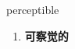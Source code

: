 
\begin{frame}
{\huge perceptible}
\begin{center}
\begin{enumerate}\Large
  \item \textbf{可察觉的}
\end{enumerate}
\end{center}
\end{frame}
